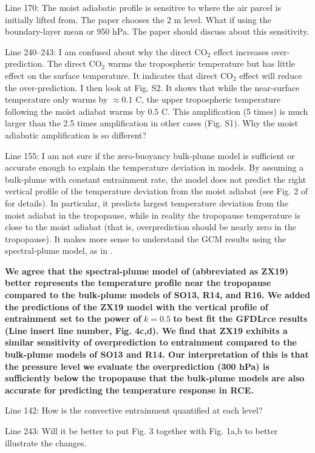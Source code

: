 \documentclass[11pt]{article}
\begin{document}
Line 170: The moist adiabatic profile is sensitive to where the air parcel is initially lifted from. The paper chooses the 2 m level. What if using the boundary-layer mean or 950 hPa. The paper should discuss about this sensitivity.

Line 240--243: I am confused about why the direct CO\(_2\) effect increases over-prediction. The direct CO\(_2\) warms the tropospheric temperature but has little effect on the surface temperature. It indicates that direct CO\(_2\) effect will reduce the over-prediction. I then look at Fig. S2. It shows that while the near-surface temperature only warms by \(\approx0.1\) C, the upper tropospheric temperature following the moist adiabat warms by \(0.5\) C. This amplification (5 times) is much larger than the 2.5 times amplification in other cases (Fig. S1). Why the moist adiabatic amplification is so different?

Line 155: I am not sure if the zero-buoyancy bulk-plume model is sufficient or accurate enough to explain the temperature deviation in models. By assuming a bulk-plume with constant entrainment rate, the model does not predict the right vertical profile of the temperature deviation from the moist adiabat (see Fig. 2 of \cite{zhou_conceptual_2019} for details). In particular, it predicts largest temperature deviation from the moist adiabat in the tropopause, while in reality the tropopause temperature is close to the moist adiabat (that is, overprediction should be nearly zero in the tropopause). It makes more sense to understand the GCM results using the spectral-plume model, as in \cite{zhou_conceptual_2019}.

\textbf{We agree that the spectral-plume model of} \cite{zhou_conceptual_2019} \textbf{(abbreviated as ZX19) better represents the temperature profile near the tropopause compared to the bulk-plume models of SO13, R14, and R16. We added the predictions of the ZX19 model with the vertical profile of entrainment set to the power of} \(k=0.5\) \textbf{to best fit the GFDLrce results (Line insert line number, Fig. 4c,d). We find that ZX19 exhibits a similar sensitivity of overprediction to entrainment compared to the bulk-plume models of SO13 and R14. Our interpretation of this is that the pressure level we evaluate the overprediction (300 hPa) is sufficiently below the tropopause that the bulk-plume models are also accurate for predicting the temperature response in RCE.}

Line 142: How is the convective entrainment quantified at each level?

Line 243: Will it be better to put Fig. 3 together with Fig. 1a,b to better illustrate the changes.



\end{document}
